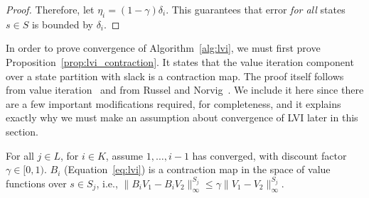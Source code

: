\begin{proof}
Therefore, let $\eta_i = (1 - \gamma) \delta_i$. This guarantees that error \emph{for all} states $s \in S$ is bounded by $\delta_i$.
\end{proof}

In order to prove convergence of Algorithm~\ref{alg:lvi}, we must first prove Proposition~\ref{prop:lvi_contraction}. It states that the value iteration component over a state partition with slack is a contraction map. The proof itself follows from value iteration~\cite{Bellman57} and from Russel and Norvig~. We include it here since there are a few important modifications required, for completeness, and it explains exactly why we must make an assumption about convergence of LVI later in this section.

\begin{proposition}
    \label{prop:lvi_contraction}
    For all $j \in L$, for $i \in K$, assume $1, \ldots, i - 1$ has converged, with discount factor $\gamma \in [0, 1)$. $B_i$ (Equation~\ref{eq:lvi}) is a contraction map in the space of value functions over $s \in S_j$, i.e., $\| B_i V_1 - B_i V_2 \|_\infty^{S_j} \leq \gamma \| V_1 - V_2 \|_\infty^{S_j}$.
\end{proposition}

